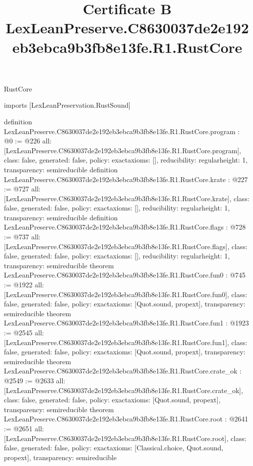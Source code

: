 \begin{lexlean}{RustCore}
\title{Certificate B LexLeanPreserve.C8630037de2e192eb3ebca9b3fb8e13fe.R1.RustCore}
\begin{coremodule}
imports [LexLeanPreservation.RustSound]

definition LexLeanPreserve.C8630037de2e192eb3ebca9b3fb8e13fe.R1.RustCore.program : @0 := @226 {
  all: [LexLeanPreserve.C8630037de2e192eb3ebca9b3fb8e13fe.R1.RustCore.program],
  class: false,
  generated: false,
  policy: exact{axioms: []},
  reducibility: regular{height: 1},
  transparency: semireducible
}
definition LexLeanPreserve.C8630037de2e192eb3ebca9b3fb8e13fe.R1.RustCore.krate : @227 := @727 {
  all: [LexLeanPreserve.C8630037de2e192eb3ebca9b3fb8e13fe.R1.RustCore.krate],
  class: false,
  generated: false,
  policy: exact{axioms: []},
  reducibility: regular{height: 1},
  transparency: semireducible
}
definition LexLeanPreserve.C8630037de2e192eb3ebca9b3fb8e13fe.R1.RustCore.flags : @728 := @737 {
  all: [LexLeanPreserve.C8630037de2e192eb3ebca9b3fb8e13fe.R1.RustCore.flags],
  class: false,
  generated: false,
  policy: exact{axioms: []},
  reducibility: regular{height: 1},
  transparency: semireducible
}
theorem LexLeanPreserve.C8630037de2e192eb3ebca9b3fb8e13fe.R1.RustCore.fun0 : @745 := @1922 {
  all: [LexLeanPreserve.C8630037de2e192eb3ebca9b3fb8e13fe.R1.RustCore.fun0],
  class: false,
  generated: false,
  policy: exact{axioms: [Quot.sound, propext]},
  transparency: semireducible
}
theorem LexLeanPreserve.C8630037de2e192eb3ebca9b3fb8e13fe.R1.RustCore.fun1 : @1923 := @2545 {
  all: [LexLeanPreserve.C8630037de2e192eb3ebca9b3fb8e13fe.R1.RustCore.fun1],
  class: false,
  generated: false,
  policy: exact{axioms: [Quot.sound, propext]},
  transparency: semireducible
}
theorem LexLeanPreserve.C8630037de2e192eb3ebca9b3fb8e13fe.R1.RustCore.crate_ok : @2549 := @2633 {
  all: [LexLeanPreserve.C8630037de2e192eb3ebca9b3fb8e13fe.R1.RustCore.crate_ok],
  class: false,
  generated: false,
  policy: exact{axioms: [Quot.sound, propext]},
  transparency: semireducible
}
theorem LexLeanPreserve.C8630037de2e192eb3ebca9b3fb8e13fe.R1.RustCore.root : @2641 := @2651 {
  all: [LexLeanPreserve.C8630037de2e192eb3ebca9b3fb8e13fe.R1.RustCore.root],
  class: false,
  generated: false,
  policy: exact{axioms: [Classical.choice, Quot.sound, propext]},
  transparency: semireducible
}


\end{coremodule}
\end{lexlean}
